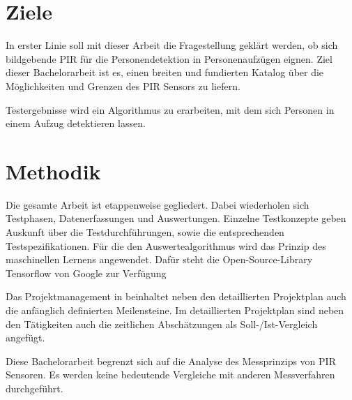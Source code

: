 \section{Ziele}
\label{sec:Einleitung}
In erster Linie soll mit dieser Arbeit die Fragestellung geklärt werden, ob sich bildgebende \ac{PIR} für die Personendetektion in Personenaufzügen eignen. Ziel dieser Bachelorarbeit ist es, einen breiten und fundierten Katalog über die Möglichkeiten und Grenzen des PIR Sensors zu liefern.

Testergebnisse wird ein Algorithmus zu erarbeiten, mit dem sich Personen in einem Aufzug detektieren lassen. 

\section{Methodik}
\label{sec:Methodik}
Die gesamte Arbeit ist etappenweise gegliedert. Dabei wiederholen sich Testphasen, Datenerfassungen und Auswertungen. Einzelne Testkonzepte geben Auskunft über die Testdurchführungen, sowie die entsprechenden Testspezifikationen. Für die den Auswertealgorithmus wird das Prinzip des maschinellen Lernens angewendet. Dafür steht die Open-Source-Library Tensorflow von Google zur Verfügung 

Das Projektmanagement in  beinhaltet neben den detaillierten Projektplan auch die anfänglich definierten Meilensteine. Im detaillierten Projektplan sind neben den Tätigkeiten auch die zeitlichen Abschätzungen als Soll-/Ist-Vergleich angefügt. 


Diese Bachelorarbeit begrenzt sich auf die Analyse des Messprinzips von PIR Sensoren. Es werden keine bedeutende Vergleiche mit anderen Messverfahren durchgeführt. 